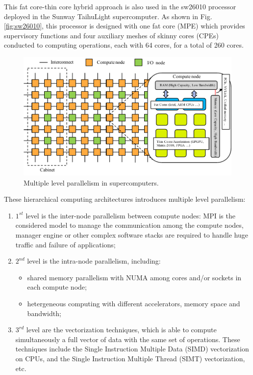 This fat core-thin core hybrid approach is also used in the sw26010 processor deployed in the Sunway TaihuLight supercomputer. As shown in Fig. \ref{fig:sw26010}, this processor is designed with one fat core (MPE) which provides supervisory functions and four auxiliary meshes of skinny cores  (CPEs) conducted to computing operations, each with 64 cores, for a total of 260 cores.

\begin{figure}[htbp]
	\centering
	\includegraphics[width=6.2in]{fig/supercomputer_arch.pdf}
	\caption{Multiple level parallelism in supercomputers.}
	\label{fig:supercomputer_arch}
\end{figure}

These hierarchical computing architectures introduces multiple level parallelism:

\begin{enumerate}
	\item $1^{st}$ level is the inter-node parallelism between compute nodes: MPI is the considered model to manage the communication among the compute nodes, manager engine or other complex software stacks are required to handle huge traffic and failure of applications;
	\item $2^{nd}$ level is the intra-node parallelism, including:
	\begin{itemize}
		\item shared memory parallelism with NUMA among cores and/or sockets in each compute node;
		\item hetergeneous computing with different accelerators, memory space and bandwidth;
	\end{itemize}
	\item $3^{rd}$ level are the vectorization techniques, which is able to compute simultaneously a full vector of data with the same set of operations. These techniques include the Single Instruction Multiple Data (SIMD) vectorization on CPUs, and the Single Instruction Multiple Thread (SIMT) vectorization, etc.
\end{enumerate}

